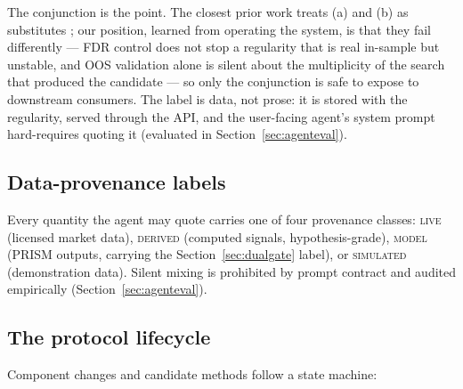 \documentclass[11pt]{article}
\begin{document}
The conjunction is the point. The closest prior work treats (a) and (b)
as substitutes \citep{harvey2016and}; our position, learned from
operating the system, is that they fail differently --- FDR control does
not stop a regularity that is real in-sample but unstable, and OOS
validation alone is silent about the multiplicity of the search that
produced the candidate --- so only the conjunction is safe to expose to
downstream consumers. The label is data, not prose: it is stored with
the regularity, served through the API, and the user-facing agent's
system prompt hard-requires quoting it (evaluated in
Section~\ref{sec:agenteval}).

\subsection{Data-provenance labels}

Every quantity the agent may quote carries one of four provenance
classes: \textsc{live} (licensed market data), \textsc{derived}
(computed signals, hypothesis-grade), \textsc{model} (PRISM outputs,
carrying the Section~\ref{sec:dualgate} label), or \textsc{simulated}
(demonstration data). Silent mixing is prohibited by prompt contract
and audited empirically (Section~\ref{sec:agenteval}).

\subsection{The protocol lifecycle}\label{sec:lifecycle}

Component changes and candidate methods follow a state machine:
\end{document}
